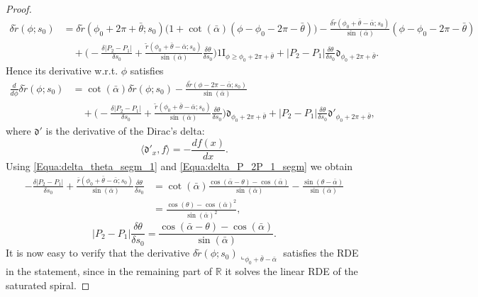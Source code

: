 \documentclass[reqno]{amsart}
\theoremstyle{definition} \newtheorem{definition}{Definition}[section]
\theoremstyle{definition} \newtheorem{remark}[definition]{Remark}
\theoremstyle{plain} \newtheorem{lemma}[definition]{Lemma}
\theoremstyle{plain} \newtheorem{proposition}[definition]{Proposition}
\theoremstyle{plain} \newtheorem{theorem}[definition]{Theorem}
\theoremstyle{plain} \newtheorem{corollary}[definition]{Corollary}
\theoremstyle{definition} \newtheorem{example}[definition]{Example}
\theoremstyle{plain} \newtheorem{claim}[clai]{Claim}
\theoremstyle{definition} \newtheorem{assumption}[definition]{Assumption}
\theoremstyle{definition} \newtheorem{observation}[definition]{Observation}
\newcommand{\R}{\mathbb{R}}
\newcommand{\ind}{1\!\!\mathrm{I}}
\newcommand{\1}{\mathbbm 1}
\newcommand{\Diracd}{\mathfrak{d}}
\newcommand{\rest}{\llcorner}
\numberwithin{equation}{section} %
\theoremstyle{plain} \newtheorem*{theorem*}{Theorem}
\theoremstyle{plain} \newtheorem{mthm}[maintheorem]{Main Theorem}
\theoremstyle{plain} \newtheorem*{mthm*}{Main Theorem}
\theoremstyle{plain} \newtheorem*{conjecture*}{Conjecture}
\theoremstyle{plain} \newtheorem{conjecture}[definition]{Conjecture}
\theoremstyle{plain} \newtheorem*{problem*}{Problem}
\begin{document}
\begin{proof}
\begin{align*}
\delta \tilde r(\phi;s_0) &= \delta \tilde r(\phi_0 + 2\pi + \bar\theta;s_0) \big( 1 + \cot(\bar \alpha) (\phi - \phi_0 - 2\pi - \bar \theta) \big) - \frac{\delta \tilde r(\phi_0 + \bar \theta - \bar \alpha;s_0)}{\sin(\bar \alpha)} (\phi - \phi_0 - 2\pi - \bar \theta) \\
& \quad + \bigg( - \frac{\delta |P_2 - P_1|}{\delta s_0} + \frac{\tilde r(\phi_0 + \bar \theta - \bar \alpha;s_0)}{\sin(\bar \alpha)} \frac{\delta \theta}{\delta s_0} \bigg) \ind_{\phi \geq \phi_0 + 2\pi + \bar \theta} + |P_2 - P_1| \frac{\delta \theta}{\delta s_0} \Diracd_{\phi_0 + 2\pi + \bar \theta}.
\end{align*}
Hence its derivative w.r.t. $\phi$ satisfies
\begin{align*}
\frac{d}{d\phi} \delta \tilde r(\phi;s_0) &= \cot(\bar \alpha) \delta \tilde r(\phi;s_0) - \frac{\delta \tilde r(\phi - 2\pi - \bar \alpha;s_0)}{\sin(\bar \alpha)} \\
& \quad + \bigg( - \frac{\delta |P_2 - P_1|}{\delta s_0} + \frac{\tilde r(\phi_0 + \bar \theta - \bar \alpha;s_0)}{\sin(\bar \alpha)} \frac{\delta \theta}{\delta s_0}  \bigg) \Diracd_{\phi_0 + 2\pi + \bar\theta} + |P_2 - P_1| \frac{\delta \theta}{\delta s_0} \Diracd'_{\phi_0 + 2\pi + \bar \theta},
\end{align*}
where $\Diracd'$ is the derivative of the Dirac's delta:
\begin{equation*}
\langle \Diracd'_x, f \rangle = - \frac{df(x)}{dx}.
\end{equation*}
Using \eqref{Equa:delta_theta_segm_1} and \eqref{Equa:delta_P_2P_1_segm} we obtain
\begin{align*}
- \frac{\delta |P_2 - P_1|}{\delta s_0} + \frac{\bar r(\phi_0 + \bar \theta - \bar \alpha;s_0)}{\sin(\bar \alpha)} \frac{\delta \theta}{\delta s_0} &= \cot(\bar \alpha) \frac{\cos(\bar \alpha - \theta) - \cos(\bar \alpha)}{\sin(\bar \alpha)} - \frac{\sin(\theta - \bar \alpha)}{\sin(\bar \alpha)} \\
&= \frac{\cos(\theta) - \cos(\bar \alpha)^2}{\sin(\bar \alpha)^2},
\end{align*}
\begin{equation*}
|P_2 - P_1| \frac{\delta \theta}{\delta s_0} = \frac{\cos(\bar \alpha - \theta) - \cos(\bar \alpha)}{\sin(\bar \alpha)}.
\end{equation*}
It is now easy to verify that the derivative $\delta \tilde r(\phi;s_0) \rest_{\phi_0 + \bar \theta - \bar \alpha}$ satisfies the RDE in the statement, since in the remaining part of $\R$ it solves the linear RDE of the saturated spiral.
\end{proof}
\end{document}
